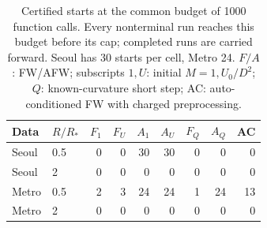 \begin{table}[htbp]
\centering\small
\caption{Certified starts at the common budget of 1000 function calls. Every nonterminal run reaches this budget before its cap; completed runs are carried forward. Seoul has 30 starts per cell, Metro 24. $F/A$: FW/AFW; subscripts $1,U$: initial $M=1,U_0/D^2$; $Q$: known-curvature short step; AC: auto-conditioned FW with charged preprocessing.}
\label{tab:budget}
\begin{tabular}{llrrrrrrr}
\toprule
Data & $R/R_*$ & $F_1$ & $F_U$ & $A_1$ & $A_U$ & $F_Q$ & $A_Q$ & AC \\
\midrule
Seoul & 0.5 & 0 & 0 & 30 & 30 & 0 & 0 & 0 \\
Seoul & 2 & 0 & 0 & 0 & 0 & 0 & 0 & 0 \\
Metro & 0.5 & 2 & 3 & 24 & 24 & 1 & 24 & 13 \\
Metro & 2 & 0 & 0 & 0 & 0 & 0 & 0 & 0 \\
\bottomrule
\end{tabular}
\end{table}
